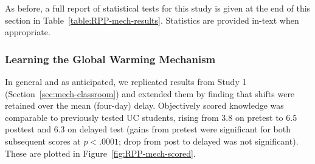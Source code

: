 As before, a full report of statistical tests for this study is given at the end of this
section in Table~\ref{table:RPP-mech-results}. Statistics are provided in-text
when appropriate.
    
\subsubsection{Learning the Global Warming Mechanism}

In general and as anticipated, we replicated results from Study 1
(Section~\ref{sec:mech-classroom}) and extended
them by finding that shifts were retained over the mean (four-day) delay.
Objectively scored knowledge was comparable to previously tested UC students,
rising from 3.8 on pretest to 6.5 posttest and 6.3 on delayed test (gains from
pretest were significant for both subsequent scores at $p<.0001$; drop from post
to delayed was not significant). These are plotted in
Figure~\ref{fig:RPP-mech-scored}. 

